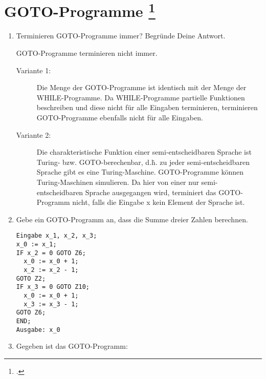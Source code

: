 \documentclass{lehramt-informatik-aufgabe}
\begin{document}
\section{GOTO-Programme
\footcite[Aufgabe 4]{theo:ab:4}}

\begin{enumerate}


\item Terminieren GOTO-Programme immer? Begründe Deine Antwort.

\begin{liAntwort}
GOTO-Programme terminieren nicht immer.

\begin{description}
\item[Variante 1:]

Die Menge der GOTO-Programme ist identisch mit der Menge der
WHILE-Programme. Da WHILE-Programme partielle Funktionen beschreiben und
diese nicht für alle Eingaben terminieren, terminieren GOTO-Programme
ebenfalls nicht für alle Eingaben.

\item[Variante 2:]

Die charakteristische Funktion einer semi-entscheidbaren Sprache ist
Turing- bzw. GOTO-berechenbar, d.\.h. zu jeder semi-entscheidbaren
Sprache gibt es eine Turing-Maschine. GOTO-Programme können
Turing-Maschinen simulieren. Da hier von einer nur semi-entscheidbaren
Sprache ausgegangen wird, terminiert das GOTO-Programm nicht, falls die
Eingabe x kein Element der Sprache ist.
\end{description}
\end{liAntwort}


\item Gebe ein GOTO-Programm an, dass die Summe dreier Zahlen berechnen.

\begin{liAntwort}
\begin{verbatim}
Eingabe x_1, x_2, x_3;
x_0 := x_1;
IF x_2 = 0 GOTO Z6;
  x_0 := x_0 + 1;
  x_2 := x_2 - 1;
GOTO Z2;
IF x_3 = 0 GOTO Z10;
  x_0 := x_0 + 1;
  x_3 := x_3 - 1;
GOTO Z6;
END;
Ausgabe: x_0
\end{verbatim}
\end{liAntwort}


\item Gegeben ist das GOTO-Programm:


\end{enumerate}
\end{document}
